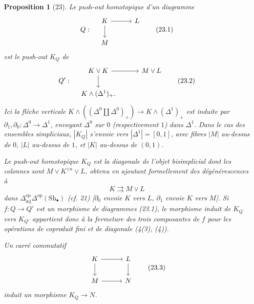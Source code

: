 \documentclass[11pt]{article}
\newcommand{\Sh}{\mathrm{Sh}}
\theoremstyle{deligne}
\newtheorem*{proposition*}{Proposition}
\newcommand{\inj}{\mathrm{inj}}
\newcommand{\op}{\mathrm{op}}
\begin{document}
\begin{proposition*}[23]
Le push-out homotopique d'un diagramme
\[
Q:\quad
\begin{tikzcd}[column sep=3.0em,row sep=1.8em]
K \arrow[r] \arrow[d] & L \\
M
\end{tikzcd}
\tag{23.1}
\]
est le push-out \(K_Q\) de
\[
Q':\quad
\begin{tikzcd}[column sep=3.0em,row sep=1.8em]
K\vee K \arrow[r] \arrow[d] & M\vee L \\
K\wedge(\Delta^1)_+ .
\end{tikzcd}
\tag{23.2}
\]
Ici la flèche verticale \(K\wedge((\Delta^0\coprod\Delta^0)_+)\to K\wedge(\Delta^1)_+\) est induite par \(\partial_1,\partial_0:\Delta^0\to\Delta^1\), envoyant \(\Delta^0\) sur \(0\) (respectivement \(1\)) dans \(\Delta^1\). Dans le cas des ensembles simpliciaux, \(|K_Q|\) s'envoie vers \(|\Delta^1|=[0,1]\), avec fibres \(|M|\) au-dessus de \(0\), \(|L|\) au-dessus de \(1\), et \(|K|\) au-dessus de \((0,1)\).

Le push-out homotopique \(K_Q\) est la diagonale de l'objet bisimplicial dont les colonnes sont \(M\vee K^{\vee n}\vee L\), obtenu en ajoutant formellement des dégénérescences à
\[
K\rightrightarrows M\vee L
\]
dans \(\Delta^{\op}_{\inj}\Delta^{\op}(\Sh_\bullet)\) (cf. 21) [\(\partial_0\) envoie \(K\) vers \(L\), \(\partial_1\) envoie \(K\) vers \(M\)]. Si \(f:Q\to Q'\) est un morphisme de diagrammes (23.1), le morphisme induit de \(K_Q\) vers \(K_{Q'}\) appartient donc à la fermeture des trois composantes de \(f\) pour les opérations de coproduit fini et de diagonale (4(3), (4)).

Un carré commutatif
\[
\begin{tikzcd}[column sep=3.0em,row sep=1.8em]
K \arrow[r] \arrow[d] & L \arrow[d] \\
M \arrow[r] & N
\end{tikzcd}
\tag{23.3}
\]
induit un morphisme \(K_Q\to N\).
\end{proposition*}
\end{document}
